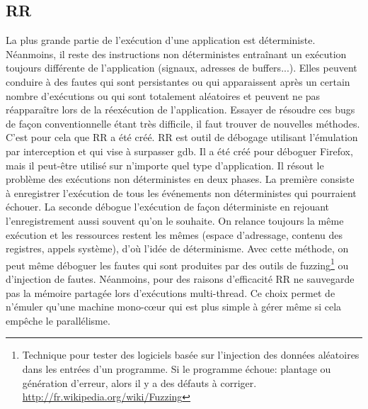 \subsection{RR}
\label{subsection:RR}

La plus grande partie de l'exécution d'une application est
déterministe. Néanmoins, il reste des instructions non déterministes entraînant
un exécution toujours différente de l'application (signaux, adresses de
buffers...). Elles peuvent conduire à des fautes qui sont persistantes ou qui
apparaissent après un certain nombre d'exécutions ou qui sont totalement
aléatoires et peuvent ne pas réapparaître lors de la réexécution de
l'application. Essayer de résoudre ces bugs de façon conventionnelle étant très
difficile, il faut trouver de nouvelles méthodes. C'est pour cela que RR a été
créé. RR \citep{RR} est outil de débogage utilisant l'émulation par interception
et qui vise à surpasser gdb. Il a été créé pour déboguer Firefox, mais il
peut-être utilisé sur n'importe quel type d'application. Il résout le problème
des exécutions non déterministes en deux phases. La première consiste à
enregistrer l'exécution de tous les événements non déterministes qui pourraient
échouer. La seconde débogue l'exécution de façon déterministe en rejouant
l'enregistrement aussi souvent qu'on le souhaite. On relance toujours la même
exécution et les ressources restent les mêmes (espace d'adressage, contenu
des registres, appels système), d'où l'idée de déterminisme. Avec cette
méthode, on peut même déboguer les fautes qui sont produites par des outils de
fuzzing\footnote{ Technique pour tester des logiciels basée sur l'injection des
  données aléatoires dans les entrées d'un programme. Si le programme échoue:
  plantage ou génération d'erreur, alors il y a des défauts à
  corriger. \\ \url{http://fr.wikipedia.org/wiki/Fuzzing}} ou d'injection de
fautes. Néanmoins, pour des raisons d'efficacité RR ne sauvegarde pas la mémoire
partagée lors d'exécutions multi-thread. Ce choix permet de n'émuler qu'une
machine mono-c\oe ur qui est plus simple à gérer même si cela empêche le
parallélisme.

